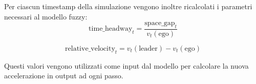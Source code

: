 \vspace{10mm}
\noindent Per ciascun timestamp della simulazione vengono inoltre ricalcolati i parametri necessari al modello fuzzy:  
\[
\mathrm{time\_headway}_t = \frac{\mathrm{space\_gap}_t}{v_t(\mathrm{ego})}
\]

\[
\mathrm{relative\_velocity}_t = v_t(\mathrm{leader}) - v_t(\mathrm{ego})
\]

\noindent Questi valori vengono utilizzati come input dal modello per calcolare la nuova accelerazione in output ad ogni passo.









